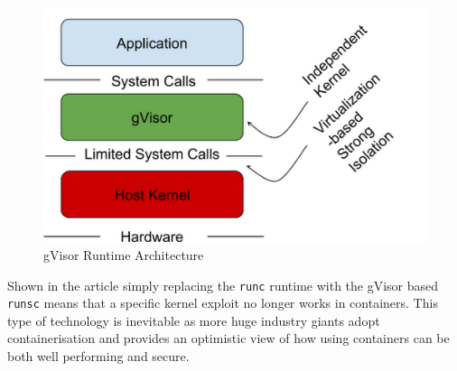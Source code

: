 \begin{figure}[h!]
    \centering
    \includegraphics[scale=0.5]{res/gvisor.PNG}
    \caption{gVisor Runtime Architecture \cite{gvisor-info}}
    \label{fig:gvisor}
\end{figure}

Shown in the article \cite{gvisor-info} simply replacing the \texttt{runc} runtime with the gVisor based \texttt{runsc} means that a specific kernel exploit no longer works in containers. This type of technology is inevitable as more huge industry giants adopt containerisation and provides an optimistic view of how using containers can be both well performing and secure.

\pagebreak
